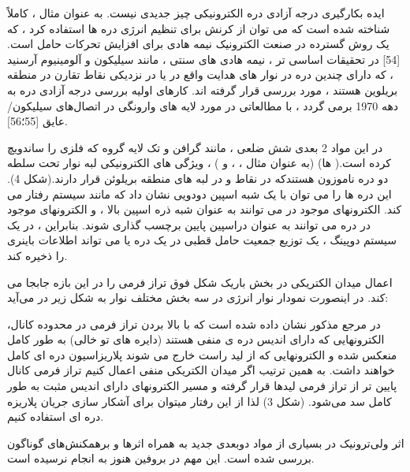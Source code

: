 ایده بکارگیری درجه آزادی دره الکترونیکی چیز جدیدی نیست. به عنوان مثال ، کاملاً شناخته شده است که می توان از کرنش برای تنظیم انرژی دره ها استفاده کرد ، که یک روش گسترده در صنعت الکترونیک نیمه هادی برای افزایش تحرکات حامل است.[54] در تحقیقات اساسی تر ، نیمه هادی های سنتی ، مانند سیلیکون و آلومینیوم آرسنید  ، که دارای چندین دره در نوار های هدایت واقع در یا در نزدیکی نقاط تقارن  در منطقه بریلوین هستند ، مورد بررسی قرار گرفته اند. کارهای اولیه بررسی درجه آزادی دره به دهه 1970 برمی گردد ، با مطالعاتی در مورد لایه های وارونگی در اتصال‌های سیلیکون/عایق [55؛56].

در این مواد 2 بعدی شش ضلعی ، مانند گرافن و تک لایه گروه  که فلزی را ساندویچ کرده است.( ها) (به عنوان مثال  ،  ،  و ) ، ویژگی های الکترونیکی لبه نوار تحت سلطه دو دره ناموزون هستندکه در نقاط  و  در لبه های منطقه بریلوئن  قرار دارند.(شکل 4). این دره ها را می توان با یک شبه اسپین دودویی نشان داد که مانند سیستم  رفتار می کند. الکترونهای موجود در  می توانند به عنوان شبه ذره اسپین بالا ، و الکترونهای موجود در دره  می توانند به عنوان دراسپین پایین برچسب گذاری شوند. بنابراین ، در یک سیستم دوپینگ ، یک توزیع جمعیت حامل قطبی در یک دره  یا  می تواند اطلاعات باینری را ذخیره کند.

اعمال میدان الکتریکی در بخش باریک شکل فوق تراز فرمی را در این بازه جابجا می کند. در اینصورت نمودار نوار انرژی در سه بخش مختلف نوار به شکل زیر در می‌آید:

در مرجع مذکور نشان داده شده است که با بالا بردن تراز فرمی در محدوده کانال، الکترونهایی که دارای اندیس دره ی منفی هستند (دایره های تو خالی) به طور کامل منعکس شده و الکترونهایی که از لید راست خارج می شوند پلاریزاسیون دره ای کامل خواهند داشت. به همین ترتیب اگر میدان الکتریکی منفی اعمال کنیم تراز فرمی کانال پایین تر از تراز فرمی لیدها قرار گرفته و مسیر الکترونهای دارای اندیس مثبت به طور کامل سد می‌شود. (شکل 3)  لذا از این رفتار میتوان برای آشکار سازی جریان پلاریزه دره ای استفاده کنیم.

اثر ولی‌ترونیک در بسیاری از مواد دوبعدی جدید به همراه اثرها و برهمکنش‌های گوناگون بررسی شده است. این مهم در بروفین هنوز به انجام نرسیده است.
% 
% 
